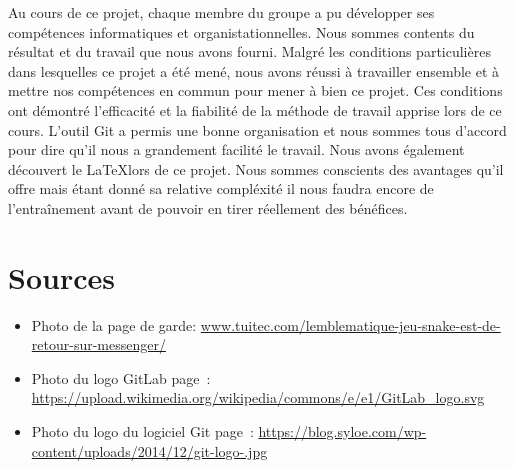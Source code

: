 \documentclass[11pt,a4paper]{article}
\begin{document}
        Au cours de ce projet, chaque membre du groupe a pu développer ses compétences informatiques et organistationnelles. Nous sommes contents du résultat et du travail que nous avons fourni. Malgré les conditions particulières dans lesquelles ce projet a été mené, nous avons réussi à travailler ensemble et à mettre nos compétences en commun pour mener à bien ce projet. Ces conditions ont démontré l'efficacité et la fiabilité de la méthode de travail apprise lors de ce cours. L'outil Git a permis une bonne organisation et nous sommes tous d'accord pour dire qu'il nous a grandement facilité le travail. Nous avons également découvert le \LaTeX lors de ce projet. Nous sommes conscients des avantages qu'il offre mais étant donné sa relative compléxité il nous faudra encore de l'entraînement avant de pouvoir en tirer réellement des bénéfices. 

        \clearpage

        
        \section*{Sources}
            \begin{itemize}
                \item Photo de la page de garde: \url{www.tuitec.com/lemblematique-jeu-snake-est-de-retour-sur-messenger/}
                \item Photo du logo GitLab page~\pageref{logo_GitLab}: \url{https://upload.wikimedia.org/wikipedia/commons/e/e1/GitLab_logo.svg}
                \item Photo du logo du logiciel Git page~\pageref{logo_Git}: \url{https://blog.syloe.com/wp-content/uploads/2014/12/git-logo-.jpg}
            \end{itemize}
\end{document}
